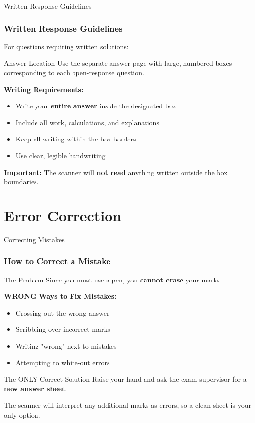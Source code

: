 \documentclass{beamer}
\begin{document}
\begin{frame}{Written Response Guidelines}
\frametitle{Written Response Guidelines}
For questions requiring written solutions:

\begin{block}{Answer Location}
Use the separate answer page with large, numbered boxes corresponding to each open-response question.
\end{block}

\textbf{Writing Requirements:}
\begin{itemize}
\item Write your \textbf{entire answer} inside the designated box
\item Include all work, calculations, and explanations
\item Keep all writing within the box borders
\item Use clear, legible handwriting
\end{itemize}

\textbf{Important:} The scanner will \textbf{not read} anything written outside the box boundaries.

\end{frame}

\section{Error Correction}

\begin{frame}{Correcting Mistakes}
\frametitle{How to Correct a Mistake}
\begin{block}{The Problem}
Since you must use a pen, you \textbf{cannot erase} your marks.
\end{block}

\textbf{WRONG Ways to Fix Mistakes:}
\begin{itemize}
\item Crossing out the wrong answer
\item Scribbling over incorrect marks
\item Writing "wrong" next to mistakes
\item Attempting to white-out errors
\end{itemize}

\begin{block}{The ONLY Correct Solution}
Raise your hand and ask the exam supervisor for a \textbf{new answer sheet}.
\end{block}

The scanner will interpret any additional marks as errors, so a clean sheet is your only option.
\end{frame}
\end{document}
